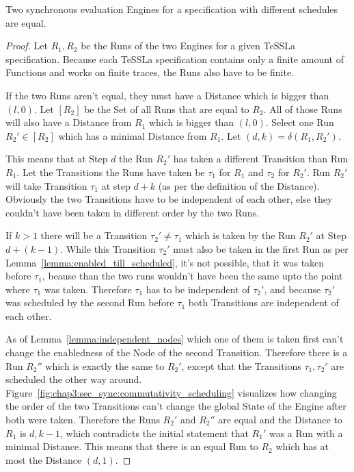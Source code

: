 \begin{theorem}[name = Equality of different synchronous evaluation Engines]\label{theorem:equal_sync_eval_engines}
  Two synchronous evaluation Engines for a specification with different schedules are equal.
\end{theorem}
\begin{proof}

Let \(R_1, R_2\) be the Runs of the two Engines for a given TeSSLa specification.
Because each TeSSLa specification contains only a finite amount of Functions and works on finite traces, the Runs also have to be finite.

If the two Runs aren't equal, they must have a Distance which is bigger than \((l, 0)\).
Let \([R_2]\) be the Set of all Runs that are equal to \(R_2\).
All of those Runs will also have a Distance from \(R_1\) which is bigger than \((l, 0)\).
Select one Run \(R_2' \in [R_2]\) which has a minimal Distance from \(R_1\).
Let \((d,k) = \delta(R_1, R_2')\).

This means that at Step \(d\) the Run \(R_2'\) has taken a different Transition than Run \(R_1\).
Let the Transitions the Runs have taken be \(\tau_1\) for \(R_1\) and \(\tau_2\) for \(R_2'\).
Run \(R_2'\) will take Transition \(\tau_1\) at step \(d+k\) (as per the definition of the Distance).
Obviously the two Transitions have to be independent of each other, else they couldn't have been taken in different order by the two Runs.

If \(k > 1\) there will be a Transition \(\tau_2' \neq \tau_1\) which is taken by the Run \(R_2'\) at Step \(d+(k-1)\).
While this Transition \(\tau_2'\) must also be taken in the first Run as per Lemma~\ref{lemma:enabled_till_scheduled}, it's not possible, that it was taken before \(\tau_1\), beause than the two runs wouldn't have been the same upto the point where \(\tau_1\) was taken.
Therefore \(\tau_1\) has to be independent of \(\tau_2'\), and because \(\tau_2'\) was scheduled by the second Run before \(\tau_1\) both Transitions are independent of each other.

As of Lemma~\ref{lemma:independent_nodes} which one of them is taken first can't change the enabledness of the Node of the second Transition.
Therefore there is a Run \(R_2''\) which is exactly the same to \(R_2'\), except that the Transitions \(\tau_1, \tau_2'\) are scheduled the other way around.
Figure~\ref{fig:chap3:sec_sync:commutativity_scheduling} visualizes how changing the order of the two Transitions can't change the global State of the Engine after both were taken.
Therefore the Runs \(R_2'\) and \(R_2''\) are equal and the Distance to \(R_1\) is \(d, k-1\), which contradicts the initial statement that \(R_1'\) was a Run with a minimal Distance.
This means that there is an equal Run to \(R_2\) which has at most the Distance \((d, 1)\).


\end{proof}
